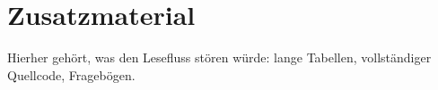 
\appendix

\chapter{Zusatzmaterial}\label{app:zusatz}

Hierher gehört, was den Lesefluss stören würde: lange Tabellen, vollständiger Quellcode, Fragebögen.
